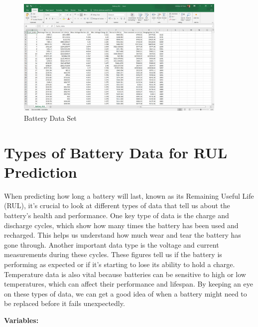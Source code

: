 \begin{figure}[h!]
    \centering
    \includegraphics[width=0.9\textwidth]{datset.jpg} %
    \caption{Battery Data Set}
    \label{fig:another}
\end{figure}

\section{Types of Battery Data for RUL Prediction}

When predicting how long a battery will last, known as its Remaining Useful Life (RUL), it's crucial to look at different types of data that tell us about the battery's health and performance. One key type of data is the charge and discharge cycles, which show how many times the battery has been used and recharged. This helps us understand how much wear and tear the battery has gone through. Another important data type is the voltage and current measurements during these cycles. These figures tell us if the battery is performing as expected or if it's starting to lose its ability to hold a charge. Temperature data is also vital because batteries can be sensitive to high or low temperatures, which can affect their performance and lifespan. By keeping an eye on these types of data, we can get a good idea of when a battery might need to be replaced before it fails unexpectedly.

\vspace{0.4in}
\textbf{Variables:}


